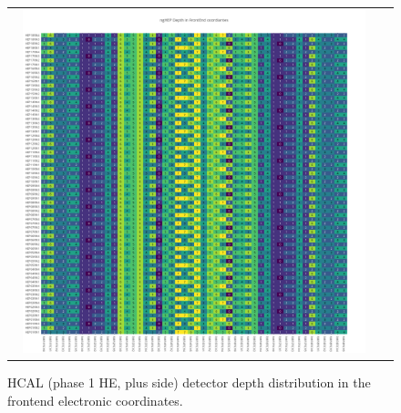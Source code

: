 \begin{figure}[htb]
 \begin{center}
  \begin{tabular}{cc}
   \includegraphics[angle=0,width=0.95\textwidth]{figures/appendix/ngHEP_Depth_in_FrontEnd.png}
  \end{tabular}
	\caption{HCAL (phase 1 HE, plus side) detector depth distribution in the frontend electronic coordinates.}
  \label{fig:lmapngHEPDepthFEC}
 \end{center}
\end{figure}
\clearpage

